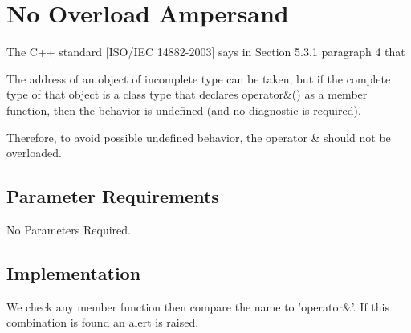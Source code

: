 %
%

\section{No Overload Ampersand}
\label{NoOverloadAmpersand::overview}
The C++ standard [ISO/IEC 14882-2003] says in Section 5.3.1 paragraph
4 that

    The address of an object of incomplete type can be taken, but if
    the complete type of that object is a class type that declares
    operator\&() as a member function, then the behavior is undefined
    (and no diagnostic is required).

Therefore, to avoid possible undefined behavior, the operator \& should
not be overloaded.

\subsection{Parameter Requirements}

   No Parameters Required.

\subsection{Implementation}

We check any member function then compare the name to 'operator\&'.
If this combination is found an alert is raised.

